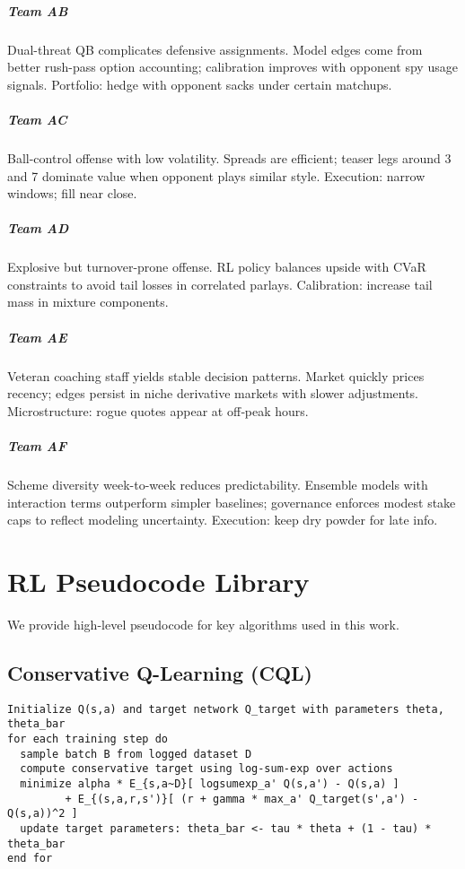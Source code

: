 \documentclass[12pt]{report}  %
\numberwithin{equation}{section}
\theoremstyle{plain}
\theoremstyle{definition}
\theoremstyle{remark}
\begin{document}
\paragraph{Team AB} Dual-threat QB complicates defensive assignments. Model edges come from better rush-pass option accounting; calibration improves with opponent spy usage signals. Portfolio: hedge with opponent sacks under certain matchups.

\paragraph{Team AC} Ball-control offense with low volatility. Spreads are efficient; teaser legs around 3 and 7 dominate value when opponent plays similar style. Execution: narrow windows; fill near close.

\paragraph{Team AD} Explosive but turnover-prone offense. RL policy balances upside with CVaR constraints to avoid tail losses in correlated parlays. Calibration: increase tail mass in mixture components.

\paragraph{Team AE} Veteran coaching staff yields stable decision patterns. Market quickly prices recency; edges persist in niche derivative markets with slower adjustments. Microstructure: rogue quotes appear at off‑peak hours.

\paragraph{Team AF} Scheme diversity week-to-week reduces predictability. Ensemble models with interaction terms outperform simpler baselines; governance enforces modest stake caps to reflect modeling uncertainty. Execution: keep dry powder for late info.

\iffalse %
\chapter{RL Pseudocode Library}
We provide high-level pseudocode for key algorithms used in this work.

\section{Conservative Q-Learning (CQL)}
\begin{verbatim}
Initialize Q(s,a) and target network Q_target with parameters theta, theta_bar
for each training step do
  sample batch B from logged dataset D
  compute conservative target using log-sum-exp over actions
  minimize alpha * E_{s,a~D}[ logsumexp_a' Q(s,a') - Q(s,a) ]
         + E_{(s,a,r,s')}[ (r + gamma * max_a' Q_target(s',a') - Q(s,a))^2 ]
  update target parameters: theta_bar <- tau * theta + (1 - tau) * theta_bar
end for
\end{verbatim}
\end{document}
